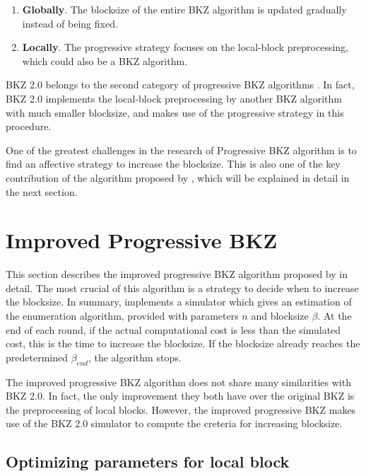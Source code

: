 \documentclass[11pt]{article}
\begin{document}
\begin{enumerate}
\item \textbf{Globally}. The blocksize of the entire BKZ algorithm is updated gradually instead of being fixed.
\item \textbf{Locally}. The progressive strategy focuses on the local-block preprocessing, which could also be a BKZ algorithm.
\end{enumerate}

BKZ 2.0 belongs to the second category of progressive BKZ algorithms \cite{cn2011bkz}.
In fact, BKZ 2.0 implements the local-block preprocessing by another BKZ algorithm with much smaller blocksize, and makes use of the progressive strategy in this procedure.

One of the greatest challenges in the research of Progressive BKZ algorithm is to find an affective strategy to increase the blocksize.
This is also one of the key contribution of the algorithm proposed by \cite{awht2016improved}, which will be explained in detail in the next section.

\section{Improved Progressive BKZ}
\label{sec:ipbkz}

This section describes the improved progressive BKZ algorithm proposed by \cite{awht2016improved} in detail.
The most crucial of this algorithm is a strategy to decide when to increase the blocksize.
In summary, \cite{awht2016improved} implements a simulator which gives an estimation of the enumeration algorithm, provided with parameters $n$ and blocksize $\beta$.
At the end of each round, if the actual computational cost is less than the simulated cost, this is the time to increase the blocksize.
If the blocksize already reaches the predetermined $\beta_{end}$, the algorithm stops.

The improved progressive BKZ algorithm does not share many similarities with BKZ 2.0.
In fact, the only improvement they both have over the original BKZ is the preprocessing of local blocks.
However, the improved progressive BKZ makes use of the BKZ 2.0 simulator to compute the creteria for increasing blocksize.

\subsection{Optimizing parameters for local block}
\label{sub:opt}
\end{document}
